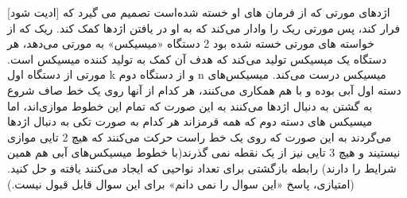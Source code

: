 [ادیت شود]
\p
    اژدهای مورتی که از فرمان های او خسته شده‌است تصمیم می گیرد که فرار کند، پس مورتی ریک را وادار می‌کند که به او در یافتن اژدها کمک کند. ریک که از خواسته های مورتی خسته شده بود 2 دستگاه «میسیکس» به مورتی می‌دهد، هر دستگاه یک میسیکس تولید می‌کند که هدف آن کمک به تولید کننده میسیکس است. مورتی از دستگاه اول k و از دستگاه دوم n میسیکس درست می‌کند. میسیکس‌های دسته اول آبی بوده و با هم همکاری می‌کنند، هر کدام از آنها روی یک خط صاف شروع به گشتن  به دنبال اژدها می‌کنند به این صورت که تمام این خطوط موازی‌اند، اما میسیکس های دسته دوم که همه قرمزاند هر کدام به صورت تکی به دنبال اژدها می‌گردند به این صورت که روی یک خط راست حرکت می‌کنند که هیچ 2 تایی موازی نیستیند و هیچ 3 تایی نیز از یک نقطه نمی گذرند(با خطوط میسیکس‌های آبی هم همین شرایط را دارند) رابطه بازگشتی برای تعداد نواحیی که ایجاد می‌کنند یافته و حل کنید.(امتیازی، پاسخ «این سوال را نمی دانم» برای این سوال قابل قبول نیست.)